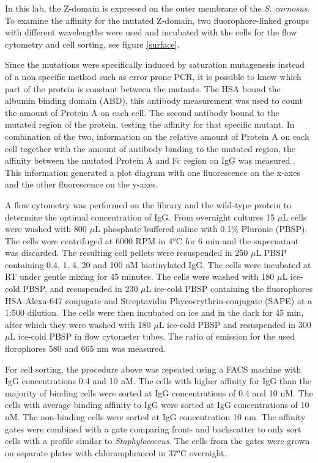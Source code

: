 \documentclass{article}
\begin{document}
	\begin{multicols}{2}
	 	
	 In this lab, the Z-domain is expressed on the outer membrane of the
 	\textit{S. carnosus}. To examine the affinity for the mutated Z-domain, two fluorophore-linked groups with different wavelengths were used and incubated with the cells for the flow cytometry and cell sorting, see figure \ref{surface}.
	
	Since the mutations were specifically induced by saturation mutagenesis instead of a non specific method such as error prone PCR, it is possible to know which part of the protein is constant between the mutants. The HSA bound the albumin binding domain (ABD), this antibody measurement was used to count the amount of Protein A on each cell. The second antibody bound to the mutated region of the protein, testing the affinity for that specific mutant. In combination of the two, information on the relative amount of Protein A on each cell together with the amount of antibody binding to the mutated region, the affinity between the mutated Protein A and Fc region on IgG was measured \cite{john}. This information generated a plot diagram with one fluorescence on the x-axes and the other fluorescence on the y-axes.
	
	A flow cytometry was performed on the library and the wild-type protein to determine the optimal concentration of IgG. From overnight cultures 15 $\mu$L cells were washed with 800 $\mu$L phosphate buffered saline with 0.1\% Pluronic (PBSP). The cells were centrifuged at 6000 RPM in 4$^o$C for 6 min and the supernatant was discarded. The resulting cell pellets were resuspended in 250 $\mu$L PBSP containing 0.4, 1, 4, 20 and 100 nM biotinylated IgG. The cells were incubated at RT under gentle mixing for 45 minutes. The cells were washed with 180 $\mu$L ice-cold PBSP, and resuspended in 230 $\mu$L ice-cold PBSP containing the fluorophores HSA-Alexa-647 conjugate and Streptavidin Phycoerythrin-conjugate (SAPE) at a 1:500 dilution. The cells were then incubated on ice and in the dark for 45 min, after which they were washed with 180 $\mu$L ice-cold PBSP and resuspended in 300 $\mu$L ice-cold PBSP in flow cytometer tubes. The ratio of emission for the used florophores 580 and 665 nm was measured.
	
	For cell sorting, the procedure above was repeated using a FACS machine with IgG concentrations 0.4 and 10 nM. The cells with higher affinity for IgG than the majority of binding cells were sorted at IgG concentrations of 0.4 and 10 nM. The cells with average binding affinity to IgG were sorted at IgG concentrations of 10 nM. The non-binding cells were sorted at IgG concentration 10 nm. The affinity gates were combined with a gate comparing front- and backscatter to only sort cells with a profile similar to \textit{Staphylococcus}. The cells from the gates were grown on separate plates with chloramphenicol in 37$^o$C overnight. 


\end{multicols}
\end{document}
